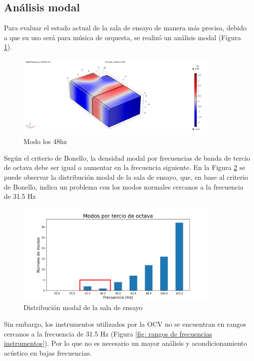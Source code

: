 \subsection{Análisis modal}
Para evaluar el estado actual de la sala de ensayo de manera más precisa, debido a que su uso será para música de orquesta,
se realizó un análisis modal (Figura \ref{fig:modo a los 48hz}). 

\begin{figure}[H]
    \centering
    \includegraphics[width=10cm]{Imagenes/Modos/modo_48hz.png}
    \caption{Modo los 48hz}
    \label{fig:modo a los 48hz}
\end{figure}

Según el criterio de Bonello, la densidad modal por frecuencias de banda de tercio de octava debe ser igual o aumentar en la frecuencia siguiente.
En la Figura \ref{fig: distribucion modal} se puede observar la distribución modal de la sala de ensayo, que, en base al criterio de Bonello, indica un problema con los modos normales cercanos a la frecuencia de 31.5 Hz

\begin{figure}[H]
    \centering
    \includegraphics[width=10cm]{Imagenes/Modos/densidad modal.png}
    \caption{Distribución modal de la sala de ensayo}
    \label{fig: distribucion modal}
\end{figure}

Sin embargo, los instrumentos utilizados por la OCV no se encuentran en rangos cercanos a la frecuencia de 31.5 Hz (Figura \ref{fig: rangos de frecuencias instrumentos}).
Por lo que no es necesario un mayor análisis y acondicionamiento acústico en bajas frecuencias.


